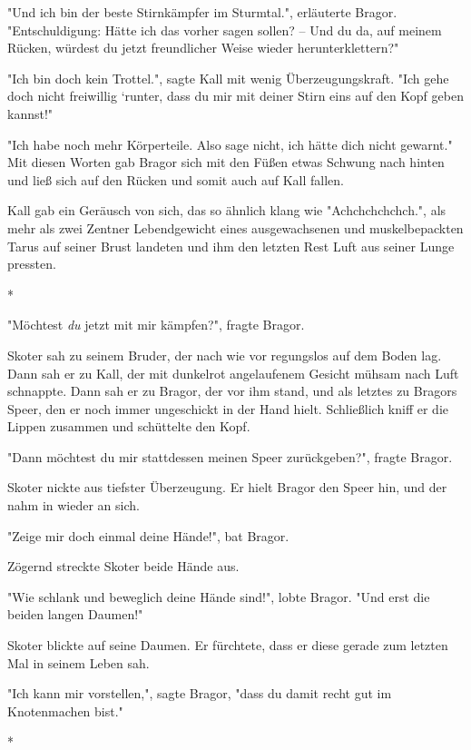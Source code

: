\documentclass[10pt, a4paper, oneside]{book}
\begin{document}
\begin{multicols}{2}
"Und ich bin der beste Stirnkämpfer im Sturmtal.", erläuterte Bragor. "Entschuldigung: Hätte ich das vorher sagen sollen? – Und du da, auf meinem Rücken, würdest du jetzt freundlicher Weise wieder herunterklettern?" 

"Ich bin doch kein Trottel.", sagte Kall mit wenig Überzeugungskraft. "Ich gehe doch nicht freiwillig ‘runter, dass du mir mit deiner Stirn eins auf den Kopf geben kannst!" 

"Ich habe noch mehr Körperteile. Also sage nicht, ich hätte dich nicht gewarnt." Mit diesen Worten gab Bragor sich mit den Füßen etwas Schwung nach hinten und ließ sich auf den Rücken und somit auch auf Kall fallen. 

Kall gab ein Geräusch von sich, das so ähnlich klang wie "Achchchchchch.", als mehr als zwei Zentner Lebendgewicht eines ausgewachsenen und muskelbepackten Tarus auf seiner Brust landeten und ihm den letzten Rest Luft aus seiner Lunge pressten. 

\begin{center}
    *
\end{center}

"Möchtest \textit{du} jetzt mit mir kämpfen?", fragte Bragor. 

Skoter sah zu seinem Bruder, der nach wie vor regungslos auf dem Boden lag. Dann sah er zu Kall, der mit dunkelrot angelaufenem Gesicht mühsam nach Luft schnappte. Dann sah er zu Bragor, der vor ihm stand, und als letztes zu Bragors Speer, den er noch immer ungeschickt in der Hand hielt. Schließlich kniff er die Lippen zusammen und schüttelte den Kopf. 

"Dann möchtest du mir stattdessen meinen Speer zurückgeben?", fragte Bragor. 

Skoter nickte aus tiefster Überzeugung. Er hielt Bragor den Speer hin, und der nahm in wieder an sich. 

"Zeige mir doch einmal deine Hände!", bat Bragor.

Zögernd streckte Skoter beide Hände aus.

"Wie schlank und beweglich deine Hände sind!", lobte Bragor. "Und erst die 
beiden langen Daumen!"

Skoter blickte auf seine Daumen. Er fürchtete, dass er diese gerade zum letzten 
Mal in seinem Leben sah.

"Ich kann mir vorstellen,", sagte Bragor, "dass du damit recht gut im 
Knotenmachen bist." 

\begin{center}
    *
\end{center}


\end{multicols}
\end{document}

